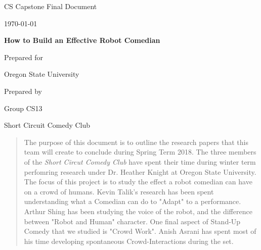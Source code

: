 \documentclass[onecolumn, draftclsnofoot,10pt, compsoc]{IEEEtran}
\def \CapstoneTeamName{	Short Circuit Comedy Club	}
\def \CapstoneTeamNumber{		CS13}
\def \CapstoneProjectName{		How to Build an Effective Robot Comedian}
\def \CapstoneSponsorCompany{	Oregon State University}
\def \DocType{		%
				Final Document
				}
\begin{document}
\begin{titlepage}
    \begin{singlespace}
        \hfill
        \par\vspace{.2in}
        \centering
        \scshape{
            \huge CS Capstone \DocType \par
            {\large\today}\par
            \vspace{.5in}
            \textbf{\Huge\CapstoneProjectName}\par
            \vfill
            {\large Prepared for}\par
            \Huge \CapstoneSponsorCompany\par
            \vspace{5pt}
            {\large Prepared by }\par
            Group\CapstoneTeamNumber\par
            \CapstoneTeamName\par
            \vspace{5pt}
            \vspace{20pt}
        }
        \begin{abstract}
			The purpose of this document is to outline the research papers that this team will create to conclude during Spring Term 2018.
			The three members of the \textit{Short Circut Comedy Club} have spent their time during winter term perfomring research under Dr. Heather Knight at Oregon State University.
			The focus of this project is to study the effect a robot comedian can have on a crowd of humans.
			Kevin Talik's research has been spent understanding what a Comedian can do to "Adapt" to a performance.
			Arthur Shing has been studying the voice of the robot, and the difference between "Robot and Human" character.
			One final aspect of Stand-Up Comedy that we studied is "Crowd Work". Anish Asrani has spent most of his time developing spontaneous Crowd-Interactions during the set.
        \end{abstract}
    \end{singlespace}
\end{titlepage}
\newpage
{}
\tableofcontents
\clearpage
\end{document}
